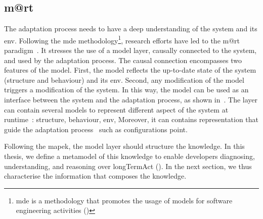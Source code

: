 \subsection[Models@run.time]{\Gls{m@rt}}
\label{sec:background:sas:m@rt}
The adaptation process needs to have a deep understanding of the system and its \gls{env}.
Following the \gls{mde} methodology\footnote{\gls{mde} is a methodology that promotes the usage of \glspl{model} for software engineering activities (\cf {})}, research efforts have led to the \gls{m@rt} paradigm~\cite{DBLP:journals/computer/MorinBJFS09, DBLP:journals/computer/BlairBF09}.
It stresses the use of a model layer, causally connected to the system, and used by the adaptation process.
The causal connection encompasses two features of the \gls{model}.
First, the model reflects the up-to-date state of the system (structure and behaviour) and its \gls{env}.
Second, any modification of the model triggers a modification of the system.
In this way, the \gls{model} can be used as an interface between the system and the adaptation process, as shown in~.
The layer can contain several models to represent different aspect of the system at runtime~\cite{DBLP:journals/computer/MorinBJFS09}: structure, \gls{behaviour}, \gls{env}, \etc
Moreover, it can contains representation that guide the adaptation process~\cite{DBLP:journals/computer/CetinaGFP09, DBLP:journals/computer/HallsteinsenHPS08} such as configurations point.

Following the \gls{mapek}, the model layer should structure the knowledge.
In this thesis, we define a metamodel of this knowledge to enable developers diagnosing, understanding, and reasoning over \gls{longTermAct} (\cf {}).
In the next section, we thus characterise the information that composes the knowledge.


